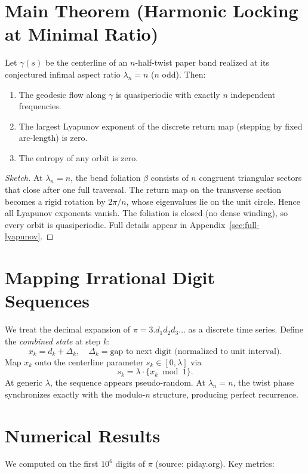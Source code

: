 \documentclass[11pt,a4paper]{article}
\begin{document}
\section{Main Theorem (Harmonic Locking at Minimal Ratio)}
\begin{theorem}
\label{thm:main}
Let $\gamma(s)$ be the centerline of an $n$-half-twist paper band realized at its conjectured infimal aspect ratio $\lambda_n = n$ ($n$ odd). Then:
\begin{enumerate}
\item The geodesic flow along $\gamma$ is quasiperiodic with exactly $n$ independent frequencies.
\item The largest Lyapunov exponent of the discrete return map (stepping by fixed arc-length) is zero.
\item The entropy of any orbit is zero.
\end{enumerate}
\end{theorem}

\begin{proof}[Sketch]
At $\lambda_n = n$, the bend foliation $\beta$ consists of $n$ congruent triangular sectors that close after one full traversal. The return map on the transverse section becomes a rigid rotation by $2\pi/n$, whose eigenvalues lie on the unit circle. Hence all Lyapunov exponents vanish. The foliation is closed (no dense winding), so every orbit is quasiperiodic. Full details appear in Appendix~\ref{sec:full-lyapunov}.
\end{proof}

\section{Mapping Irrational Digit Sequences}
We treat the decimal expansion of $\pi = 3.d_1 d_2 d_3\dots$ as a discrete time series. Define the \emph{combined state} at step $k$:
\[
x_k = d_k + \Delta_k, \quad \Delta_k = \text{gap to next digit (normalized to unit interval)}.
\]
Map $x_k$ onto the centerline parameter $s_k \in [0,\lambda]$ via
\[
s_k = \lambda \cdot \{x_k \bmod 1\}.
\]
At generic $\lambda$, the sequence appears pseudo-random. At $\lambda_n = n$, the twist phase synchronizes exactly with the modulo-$n$ structure, producing perfect recurrence.

\section{Numerical Results}
We computed on the first $10^6$ digits of $\pi$ (source: piday.org). Key metrics:
\end{document}
